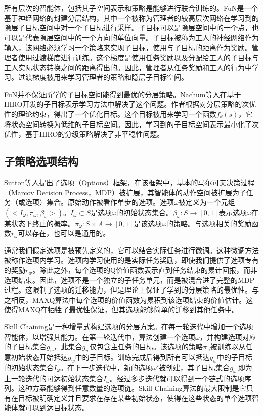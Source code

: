 所有层次的智能体，包括其子空间表示和策略是能够进行联合训练的。FuN\cite{vezhnevets2017feudal}是一个基于神经网络的封建分层结构，其中一个被称为管理者的较高层次网络在学习到的隐层子目标空间中对一个子目标进行采样。子目标可以是隐层空间中的一个点，也可以是代表隐层空间中的一个方向的单位向量。子目标被称为工人的神经网络作为输入，该网络必须学习一个策略来实现子目标，使用与子目标的距离作为奖励。管理者使用过渡梯度进行训练。这个梯度是使用任务奖励以及分配给工人的子目标与工人实际状态转换之间的距离得出的。因此，管理者从任务奖励和工人的行为中学习。过渡梯度被用来学习管理者的策略和隐层子目标空间。

FuN并不保证所学的子目标空间能得到最优的分层策略。Nachum等人\cite{nachum2018near}在基于HIRO\cite{nachum2018data}开发的子目标表示学习方法中解决了这个问题。作者根据对分层策略的次优性的理论约束，得出了一个优化目标。这个目标被用来学习一个函数$f_\theta(s)$，它将状态空间转换为低维的子目标空间。因此，学习到的子目标空间表示最小化了次优性，基于HIRO的分级策略解决了非平稳性问题。

\subsection{子策略选项结构}

Sutton等人\cite{sutton1999between}提出了选项（Options）框架，在该框架中，基本的马尔可夫决策过程（Marcov Decision Process，MDP）被扩展，其智能体的动作空间被扩展为子任务（或选项）集合。原始动作被看作单步的选项。选项$\omega$被定义为一个元组$(<I_\omega, \pi_\omega, \beta_\omega>)$。$I_\omega\subset S$是选项$\omega$的初始状态集合。$\beta_\omega:S\rightarrow[0,1]$表示选项$\omega$在某状态下终止的概率。$\pi_\omega:S\times A \rightarrow[0,1]$是该选项$\omega$的策略。与选项相关的奖励函数$r_\omega$可以存在，也可以是通用的。

通常我们假定选项是被预先定义的，它可以结合实际任务进行微调。这种微调方法被称作选项内学习。选项内学习使用的是实际任务奖励，即使我们提供了选项专有的奖励$r_w$。除此之外，每个选项的Q价值函数表示直到任务结束的累计回报，而非选项结束。因此，选项不是一个独立的子任务单元，而是被混合进了完整的MDP过程。这限制了选项的迁移能力，但是理论上保证了学到的分层策略的最优性。与之相反，MAXQ算法\cite{dietterich2000hierarchical}中每个选项的价值函数为累积到该选项结束的价值估计。这使得MAXQ在牺牲了最优性保证，但其选项能够简单的迁移到其他任务中。

Skill Chaining\cite{konidaris2009skill}是一种增量式构建选项的分层方案。在每一轮迭代中增加一个选项智能体，以增强其能力。在第一轮迭代中，算法创建一个选项$\omega$，并构建选项对应的子目标集合$g_w$，此集合$g_w$仅包含主任务的目标。该选项的策略$\pi_\omega$被训练以从任意初始状态开始抵达$g_w$中的子目标。训练完成后得到所有可以抵达$g_w$中的子目标的初始状态集合$I_\omega$。在下一步迭代中，新的选项$\omega'$被创建，其子目标集合$g_{\omega'}$即为上一轮迭代的可达初始状态集合$I_\omega$。经过多步迭代就可以得到一个链式的选项序列。这种方案能够得到任意数量的选项链。Skill Chaining算法的最大限制是它只有在目标被明确定义并且要求在存在某些初始状态，使得在这些状态的单个选项智能体就可以到达目标状态。

